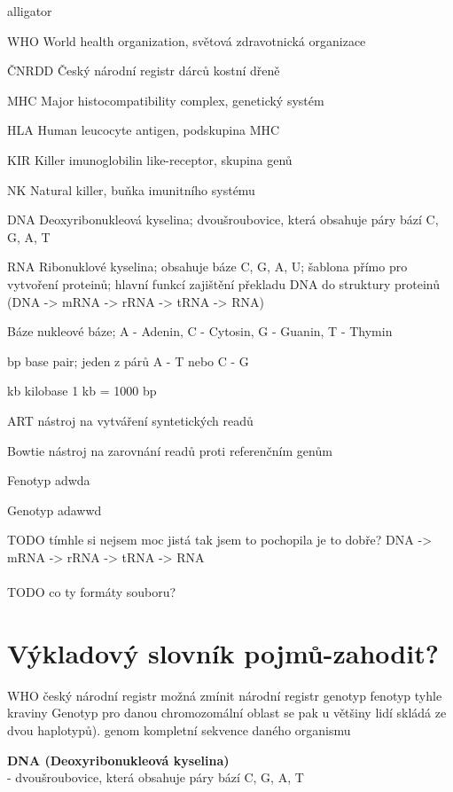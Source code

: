 \documentclass[czech,DP]{thesiskiv}
\numberwithin{equation}{section}
\begin{document}
\begin{labeling}{alligator}
	\item [WHO] World health organization, světová zdravotnická organizace
	\item [ČNRDD] Český národní registr dárců kostní dřeně
	\item [MHC] Major histocompatibility complex, genetický systém	
	\item [HLA] Human leucocyte antigen, podskupina MHC
	\item [KIR] Killer imunoglobilin like-receptor, skupina genů
	\item [NK] Natural killer, buňka imunitního systému
	\item [DNA] Deoxyribonukleová kyselina; dvoušroubovice, která obsahuje páry bází C, G, A, T 
	\item [RNA] Ribonuklové kyselina; obsahuje báze C, G, A, U; šablona přímo pro vytvoření proteinů; hlavní funkcí zajištění překladu DNA do struktury proteinů (DNA -> mRNA -> rRNA -> tRNA -> RNA) 
	\item [Báze] nukleové báze; A - Adenin, C - Cytosin, G - Guanin, T - Thymin
	\item [bp] base pair; jeden z párů A - T nebo C - G
	\item [kb] kilobase 1 kb = 1000 bp
	\item [ART] nástroj na vytváření syntetických readů
	\item [Bowtie] nástroj na zarovnání readů proti referenčním genům
	\item [Fenotyp] adwda
	\item [Genotyp] adawwd
\end{labeling}


TODO tímhle si nejsem moc jistá tak jsem to pochopila je to dobře? DNA -> mRNA -> rRNA -> tRNA -> RNA
\\
\\
TODO co ty formáty souboru?

\chapter{Výkladový slovník pojmů-zahodit?}
WHO
český národní registr 
možná zmínit národní registr
genotyp 
fenotyp tyhle kraviny
Genotyp pro danou chromozomální oblast se pak u většiny lidí skládá ze dvou haplotypů).
genom kompletní sekvence daného organismu

\textbf{DNA (Deoxyribonukleová kyselina)} \\ 
 - dvoušroubovice, která obsahuje páry bází C, G, A, T \\
\end{document}
